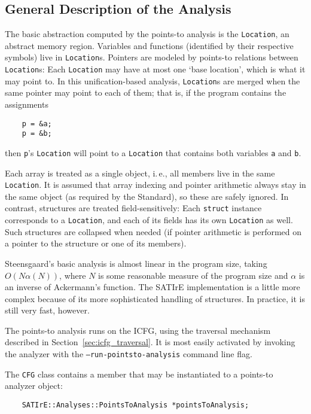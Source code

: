 \documentclass[a4paper,12pt]{report}
\begin{document}
\subsection{General Description of the Analysis}

The basic abstraction computed by the points-to analysis is the
\texttt{Location}, an abstract memory region. Variables and functions
(identified by their respective symbols) live in \texttt{Location}s.
Pointers are modeled by points-to relations between \texttt{Location}s: Each
\texttt{Location} may have at most one `base location', which is what it may
point to. In this unification-based analysis, \texttt{Location}s are merged
when the same pointer may point to each of them; that is, if the program
contains the assignments
\begin{verbatim}
    p = &a;
    p = &b;
\end{verbatim}
then \verb|p|'s \texttt{Location} will point to a \texttt{Location} that
contains both variables \verb|a| and \verb|b|.

Each array is treated as a single object, i.\,e., all members live in the
same \texttt{Location}. It is assumed that array indexing and pointer
arithmetic always stay in the same object (as required by the Standard), so
these are safely ignored. In contrast, structures are treated
field-sensitively: Each \texttt{struct} instance corresponds to a
\texttt{Location}, and each of its fields has its own \texttt{Location} as
well. Such structures are collapsed when needed (if pointer arithmetic is
performed on a pointer to the structure or one of its members).

Steensgaard's basic analysis is almost linear in the program size, taking
\(O(N \alpha(N))\), where \(N\) is some reasonable measure of the program
size and \(\alpha\) is an inverse of Ackermann's function. The SATIrE
implementation is a little more complex because of its more sophisticated
handling of structures. In practice, it is still very fast, however.

The points-to analysis runs on the ICFG, using the traversal mechanism
described in Section~\ref{sec:icfg_traversal}. It is most easily activated
by invoking the analyzer with the \texttt{--run-pointsto-analysis} command
line flag.

The \texttt{CFG} class contains a member that may be instantiated to a
points-to analyzer object:
\begin{verbatim}
    SATIrE::Analyses::PointsToAnalysis *pointsToAnalysis;
\end{verbatim}
\end{document}
